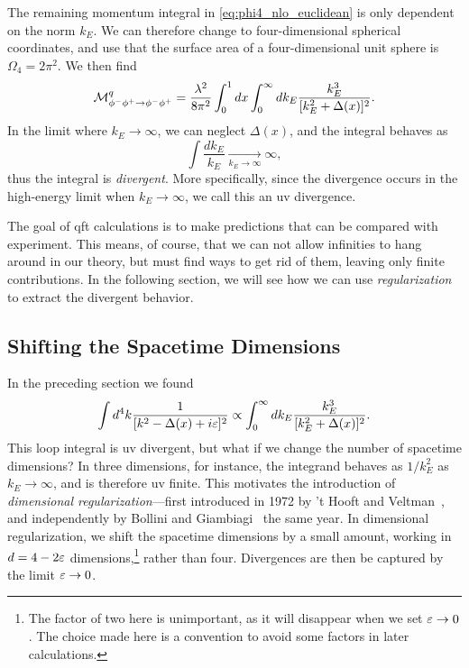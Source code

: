 The remaining momentum integral in \cref{eq:phi4_nlo_euclidean} is only dependent on the norm $k_E$. We can therefore change to four-dimensional spherical coordinates, and use that the surface area of a four-dimensional unit sphere is $\Omega_4 = 2\pi^2$. We then find
\begin{equation}\label{eq:phi4_nlo_spherical}
    \mathcal{M}_{\phi^-\phi^+\to\phi^-\phi^+}^q = \frac{\lambda^2}{8\pi^2} \int_0^1 dx \int_0^\infty dk_E \frac{k_E^3}{[k_E^2 + \Delta(x)]^2}.
\end{equation}
In the limit where $k_E\to\infty$, we can neglect $\Delta(x)$, and the integral behaves as
\begin{equation}
    \int \frac{dk_E}{k_E} \xrightarrow[k_E\to\infty]{} \infty,
\end{equation}
thus the integral is \emph{divergent}.
More specifically, since the divergence occurs in the high-energy limit when $k_E\to\infty$, we call this an \acrfull{uv} divergence.

The goal of \gls{qft} calculations is to make predictions that can be compared with experiment. This means, of course, that we can not allow infinities to hang around in our theory, but must find ways to get rid of them, leaving only finite contributions.
In the following section, we will see how we can use \emph{regularization} to extract the divergent behavior.


\subsection{Shifting the Spacetime Dimensions}\label{sec:shifting_spacetime_dim}
In the preceding section we found
\begin{equation}\label{eq:loop_int_4_dim}
    \int d^4k \frac{1}{[k^2-\Delta(x)+i\varepsilon]^2} \propto \int_0^\infty dk_E \frac{k_E^3}{[k_E^2+\Delta(x)]^2}.
\end{equation}
This loop integral is \gls{uv} divergent, but what if we change the number of spacetime dimensions?
In three dimensions, for instance, the integrand behaves as $1/k_E^2$ as $k_E\to\infty$, and is therefore \gls{uv} finite.
This motivates the introduction of \emph{dimensional regularization}---first introduced in 1972 by 't Hooft and Veltman~\cite{tHooft:1972tcz}, and independently by Bollini and Giambiagi~\cite{Bollini:1972ui} the same year.
In dimensional regularization, we shift the spacetime dimensions by a small amount, working in $d=4-2\varepsilon$ dimensions,\footnote{The factor of two here is unimportant, as it will disappear when we set $\varepsilon\to0$. The choice made here is a convention to avoid some factors in later calculations.} rather than four. Divergences are then be captured by the limit $\varepsilon\to0$.

